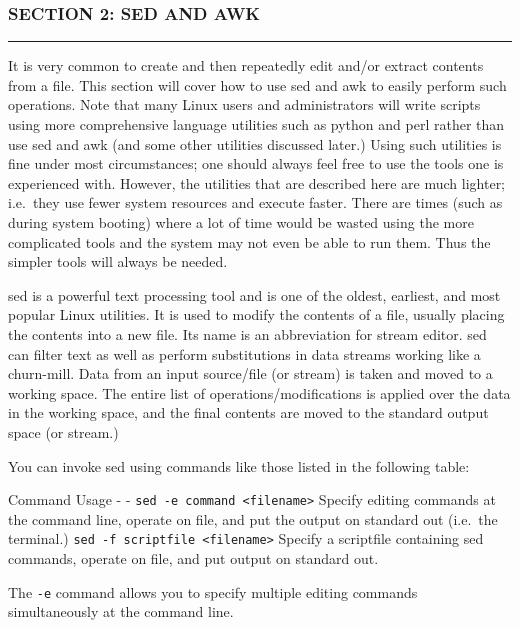 \subsubsection{SECTION 2: SED AND AWK}\label{section-2-sed-and-awk}

\begin{center}\rule{3in}{0.4pt}\end{center}

It is very common to create and then repeatedly edit and/or extract
contents from a file. This section will cover how to use sed and awk to
easily perform such operations. Note that many Linux users and
administrators will write scripts using more comprehensive language
utilities such as python and perl rather than use sed and awk (and some
other utilities discussed later.) Using such utilities is fine under
most circumstances; one should always feel free to use the tools one is
experienced with. However, the utilities that are described here are
much lighter; i.e.~they use fewer system resources and execute faster.
There are times (such as during system booting) where a lot of time
would be wasted using the more complicated tools and the system may not
even be able to run them. Thus the simpler tools will always be needed.

sed is a powerful text processing tool and is one of the oldest,
earliest, and most popular Linux utilities. It is used to modify the
contents of a file, usually placing the contents into a new file. Its
name is an abbreviation for stream editor. sed can filter text as well
as perform substitutions in data streams working like a churn-mill. Data
from an input source/file (or stream) is taken and moved to a working
space. The entire list of operations/modifications is applied over the
data in the working space, and the final contents are moved to the
standard output space (or stream.)

You can invoke sed using commands like those listed in the following
table:

Command \textbar{} Usage - \textbar{} -
\texttt{sed -e command \textless{}filename\textgreater{}} \textbar{}
Specify editing commands at the command line, operate on file, and put
the output on standard out (i.e.~the terminal.)
\texttt{sed -f scriptfile \textless{}filename\textgreater{}} \textbar{}
Specify a scriptfile containing sed commands, operate on file, and put
output on standard out.

The \texttt{-e} command allows you to specify multiple editing commands
simultaneously at the command line.


